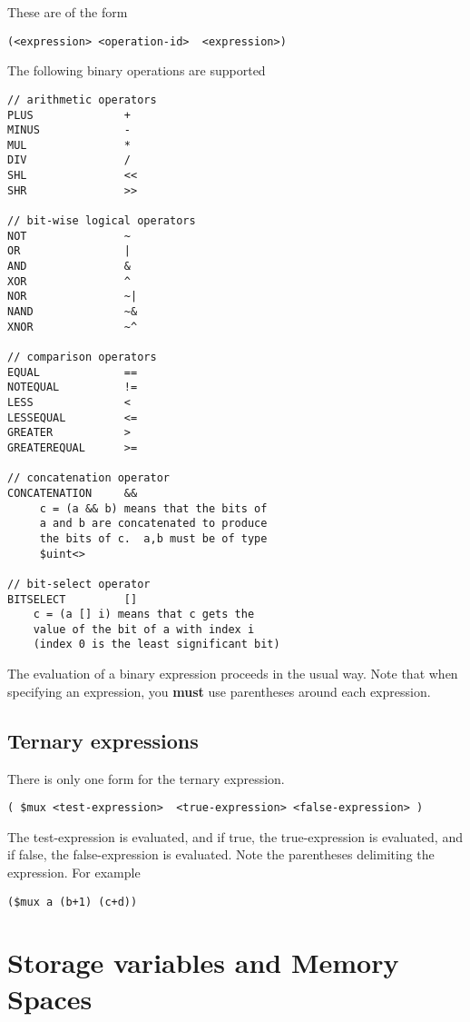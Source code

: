 \documentclass{article}
\begin{document}
These are of the
form
\begin{verbatim}
(<expression> <operation-id>  <expression>)
\end{verbatim}
The following binary operations are supported
\begin{verbatim}
// arithmetic operators
PLUS              + 
MINUS             - 
MUL               * 
DIV               / 
SHL               <<
SHR               >> 

// bit-wise logical operators
NOT               ~     
OR                |     
AND               &    
XOR               ^   
NOR               ~|     
NAND              ~&    
XNOR              ~^   

// comparison operators
EQUAL             ==
NOTEQUAL          !=
LESS              < 
LESSEQUAL         <=
GREATER           > 
GREATEREQUAL      >=

// concatenation operator
CONCATENATION     &&
     c = (a && b) means that the bits of
     a and b are concatenated to produce
     the bits of c.  a,b must be of type
     $uint<>

// bit-select operator
BITSELECT         []
    c = (a [] i) means that c gets the
    value of the bit of a with index i 
    (index 0 is the least significant bit)
\end{verbatim}
The evaluation of a binary expression proceeds in
the usual way.  Note that when specifying an 
expression, you {\bf must} use parentheses around
each expression.

\subsection{Ternary expressions}

There is only one
form for the ternary expression.
\begin{verbatim}
( $mux <test-expression>  <true-expression> <false-expression> )
\end{verbatim}%
The test-expression is evaluated, and if true, the true-expression
is evaluated, and if false, the false-expression is evaluated.
Note the parentheses delimiting the expression.
For example
\begin{verbatim}
($mux a (b+1) (c+d))
\end{verbatim}


\section{Storage variables and Memory Spaces}
\end{document}
